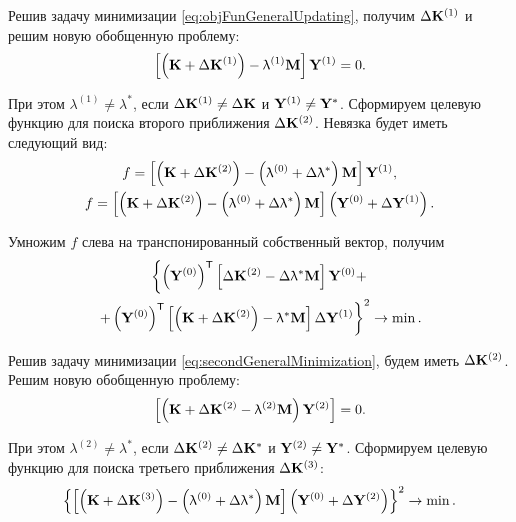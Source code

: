 Решив задачу минимизации \eqref{eq:objFunGeneralUpdating}, получим $ \Delta \mathbf{K} ^ {(1)} $ и решим новую обобщенную проблему:
\begin{equation}
	\left[ \left( \mathbf{K} + \Delta \mathbf{K} ^ {(1)} \right) - \uplambda ^ {(1)} \mathbf{M} \right] \mathbf{Y} ^ {(1)} = 0.
\end{equation}

При этом $ \lambda ^ {(1)} \neq \lambda ^ \ast $, если $ \Delta \mathbf{K} ^ {(1)} \neq \Delta \mathbf{K} $ и $ \mathbf{Y} ^ {(1)} \neq \mathbf{Y} ^ \ast $. Сформируем целевую функцию для поиска второго приближения $ \Delta \mathbf{K} ^ {(2)} $. Невязка будет иметь следующий вид:
\begin{gather*}
	f = \left[ \left( \mathbf{K} + \Delta \mathbf{K} ^ {(2)} \right) - \left( \uplambda ^ {(0)} + \Delta \uplambda ^ \ast \right) \mathbf{M} \right] \mathbf{Y} ^ {(1)}, \\
	f = \left[ \left( \mathbf{K} + \Delta \mathbf{K} ^ {(2)} \right) - \left( \uplambda ^ {(0)} + \Delta \uplambda ^ \ast \right) \mathbf{M} \right] \left( \mathbf{Y} ^ {(0)} + \Delta \mathbf{Y} ^ {(1)} \right).
\end{gather*}

Умножим $ f $ слева на транспонированный собственный вектор, получим
\begin{gather}
	\left\{ \left( \mathbf{Y} ^ {(0)} \right) ^ \mathsf{T} \left[ \Delta \mathbf{K} ^ {(2)} - \Delta \uplambda ^ \ast \mathbf{M} \right] \mathbf{Y} ^ {(0)} + \right. \nonumber \\
	\left. + \left( \mathbf{Y} ^ {(0)} \right) ^ \mathsf{T} \left[ \left( \mathbf{K} + \Delta \mathbf{K} ^ {(2)} \right) - \uplambda ^ \ast \mathbf{M} \right] \Delta \mathbf{Y} ^ {(1)} \right\} ^ 2 \rightarrow \min.
	\label{eq:secondGeneralMinimization}
\end{gather}

Решив задачу минимизации \eqref{eq:secondGeneralMinimization}, будем иметь $ \Delta \mathbf{K} ^ {(2)} $. Решим новую обобщенную проблему:
\begin{equation*}
	\left[ \left( \mathbf{K} + \Delta \mathbf{K} ^ {(2)} - \uplambda ^ {(2)} \mathbf{M} \right) \mathbf{Y} ^ {(2)} \right] = 0.
\end{equation*}

При этом $ \lambda ^ {(2)} \neq \lambda ^ \ast $, если $ \Delta \mathbf{K} ^ {(2)} \neq \Delta \mathbf{K} ^ \ast $ и $ \mathbf{Y} ^ {(2)} \neq \mathbf{Y} ^ \ast $. Сформируем целевую функцию для поиска третьего приближения $ \Delta \mathbf{K} ^ {(3)} $:
\begin{equation*}
	\left\{ \left[ \left( \mathbf{K} + \Delta \mathbf{K} ^ {(3)} \right) - \left( \uplambda ^ {(0)} + \Delta \uplambda ^ \ast \right) \mathbf{M} \right] \left( \mathbf{Y} ^ {(0)} + \Delta \mathbf{Y} ^ {(2)} \right) \right\} ^ 2 \rightarrow \min.
\end{equation*}

